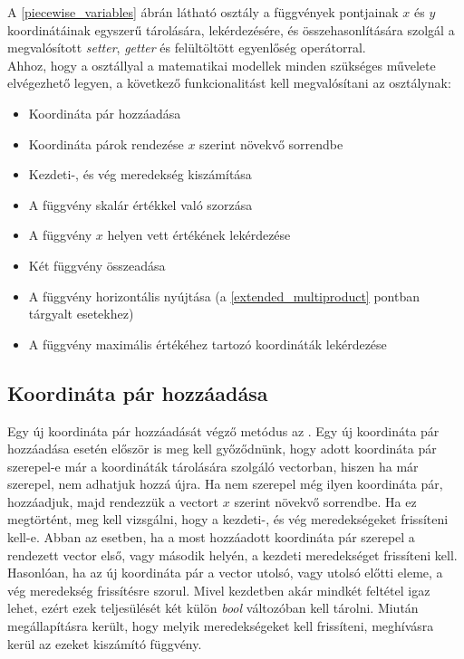 A \ref{piecewise_variables} ábrán látható  osztály a függvények pontjainak $x$ és $y$ koordinátáinak egyszerű tárolására, lekérdezésére, és összehasonlítására szolgál a megvalósított \textit{setter}, \textit{getter} és felültöltött egyenlőség operátorral.\\
Ahhoz, hogy a  osztállyal a matematikai modellek minden szükséges művelete elvégezhető legyen, a következő funkcionalitást kell megvalósítani az osztálynak:
\begin{itemize}
\item Koordináta pár hozzáadása
\item Koordináta párok rendezése $x$ szerint növekvő sorrendbe
\item Kezdeti-, és vég meredekség kiszámítása
\item A függvény skalár értékkel való szorzása
\item A függvény $x$ helyen vett értékének lekérdezése
\item Két függvény összeadása
\item A függvény horizontális nyújtása (a \ref{extended_multiproduct} pontban tárgyalt esetekhez)
\item A függvény maximális értékéhez tartozó koordináták lekérdezése
\end{itemize} 
\subsection{Koordináta pár hozzáadása} \label{addCoordinates}
Egy új koordináta pár hozzáadását végző metódus az .
Egy új koordináta pár hozzáadása esetén először is meg kell győződnünk, hogy adott koordináta pár szerepel-e már a koordináták tárolására szolgáló vectorban, hiszen ha már szerepel, nem adhatjuk hozzá újra.
Ha nem szerepel még ilyen koordináta pár, hozzáadjuk, majd rendezzük a vectort $x$ szerint növekvő sorrendbe.
Ha ez megtörtént, meg kell vizsgálni, hogy a kezdeti-, és vég meredekségeket frissíteni kell-e.
Abban az esetben, ha a most hozzáadott koordináta pár szerepel a rendezett vector első, vagy második helyén, a kezdeti meredekséget frissíteni kell.
Hasonlóan, ha az új koordináta pár a vector utolsó, vagy utolsó előtti eleme, a vég meredekség frissítésre szorul.
Mivel kezdetben akár mindkét feltétel igaz lehet, ezért ezek teljesülését két külön \textit{bool} változóban kell tárolni.
Miután megállapításra került, hogy melyik meredekségeket kell frissíteni, meghívásra kerül az ezeket kiszámító függvény. 

